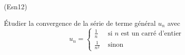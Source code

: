 \begin{tiny}(Esn12)\end{tiny} \'Etudier la convergence de la série de terme général $u_n$ avec 
\begin{displaymath}
  u_n = 
\left\lbrace 
\begin{aligned}
  \frac{1}{n} &\text{ si } n \text{ est un carré d'entier}\\
  \frac{1}{n^2} &\text{ sinon }
\end{aligned}
\right. 
\end{displaymath}
